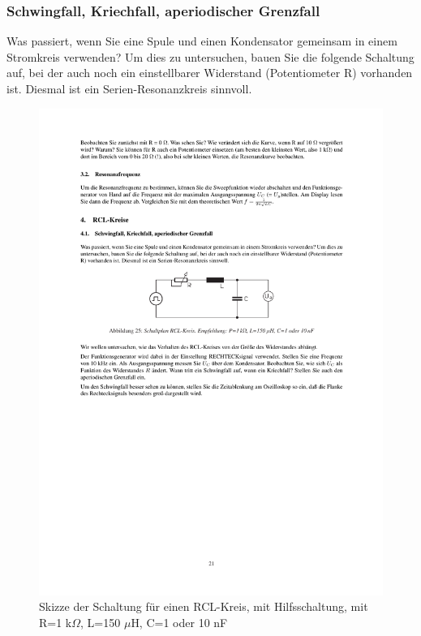 \documentclass[12pt]{scrartcl}
\begin{document}
\subsubsection{Schwingfall, Kriechfall, aperiodischer Grenzfall}
Was passiert, wenn Sie eine Spule und einen Kondensator gemeinsam in einem Stromkreis verwenden? Um dies zu untersuchen, bauen Sie die folgende Schaltung auf, bei der auch noch ein einstellbarer Widerstand (Potentiometer R) vorhanden ist. Diesmal ist ein Serien-Resonanzkreis sinnvoll.
\begin{figure}[htbp] 
  \centering
    \includegraphics[trim = 20mm 165mm 1mm 95mm, clip, scale = 1]{RCL_kreis.pdf}
  	\caption[Skizze der Schaltung für einen RCL-Kreis, mit Hilfsschaltung, mit R=1 k$\Omega$, L=150 $\mu$H, C=1 oder 10 nF]{Skizze der Schaltung für einen RCL-Kreis, mit Hilfsschaltung, mit R=1 k$\Omega$, L=150 $\mu$H, C=1 oder 10 nF\footnotemark}
  \label{fig:LC-Kreis_hilfe}
\end{figure}
\end{document}
